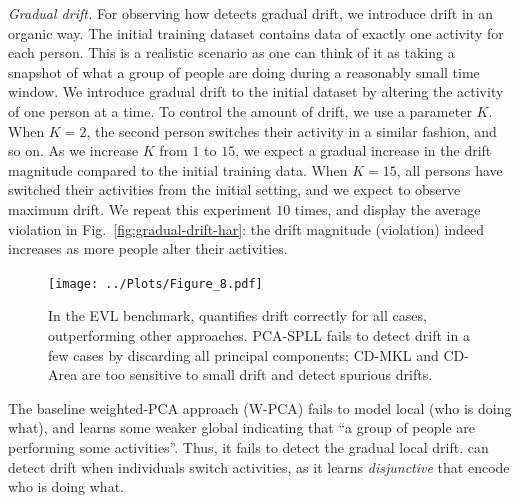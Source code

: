 \noindent \emph{Gradual drift.}  For observing how \system detects
gradual drift, we introduce drift in an organic way. The initial training
dataset contains data of exactly one activity for each person. This is a
realistic scenario as one can think of it as taking a snapshot of what a group
of people are doing during a reasonably small time window. We introduce gradual
drift to the initial dataset by altering the activity of one person at a time.
To control the amount of drift, we use a parameter $K$.  When $K = 2$, the
second person switches their activity in a similar fashion, and so on. As we
increase $K$ from $1$ to $15$, we expect a gradual increase in the drift
magnitude compared to the initial training data. When $K = 15$, all persons
have switched their activities from the initial setting, and we expect to
observe maximum drift. We repeat this experiment $10$ times, and display the
average \invariant violation in Fig.~\ref{fig:gradual-drift-har}: the drift
magnitude (violation) indeed increases as more people alter their activities.

\begin{figure}[t]
	\centering	
	\texttt{[image: ../Plots/Figure\_8.pdf]}	
		\vspace{-5mm}
	 \caption{In the EVL benchmark, \system quantifies drift correctly for all
	 cases, outperforming other approaches. PCA-SPLL fails to detect drift in a few cases by
 	 discarding all principal components; CD-MKL and CD-Area are too sensitive to
 	 small drift and detect spurious drifts.}
	\vspace{-2mm}
	\label{fig:drift-baseline-comparison-EVL}
\end{figure}

The baseline weighted-PCA approach (W-PCA) fails to model local \invariants
(who is doing what), and learns some weaker global \invariants indicating that
``a group of people are performing some activities''. Thus, it fails to detect
the gradual local drift. \system can detect drift when individuals switch
activities, as it learns \emph{disjunctive} \invariants that encode who is
doing what.

\smallskip


